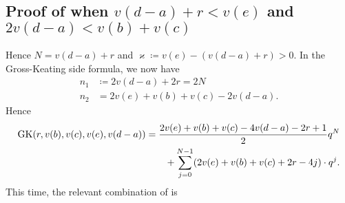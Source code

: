 \subsection{Proof of 
  when $v(d-a)+r < v(e)$ and $2v(d-a) < v(b)+v(c)$}
Hence $N = v(d-a) + r$ and $\varkappa \coloneqq v(e) - (v(d-a)+r) > 0$.
In the Gross-Keating side formula, we now have
\begin{align*}
  n_1 &\coloneqq 2v(d-a) + 2r = 2N \\
  n_2 &= 2v(e) + v(b) + v(c) - 2v(d-a).
\end{align*}
Hence
\begin{align*}
  \operatorname{GK}(r, v(b), v(c), v(e), v(d-a))
  &= \frac{2v(e)+v(b)+v(c)-4v(d-a)-2r+1}{2} q^{N} \\
    &\qquad+ \sum_{j=0}^{N-1} (2v(e)+v(b)+v(c)+2r-4j) \cdot q^j.
\end{align*}
This time, the relevant combination of  is
